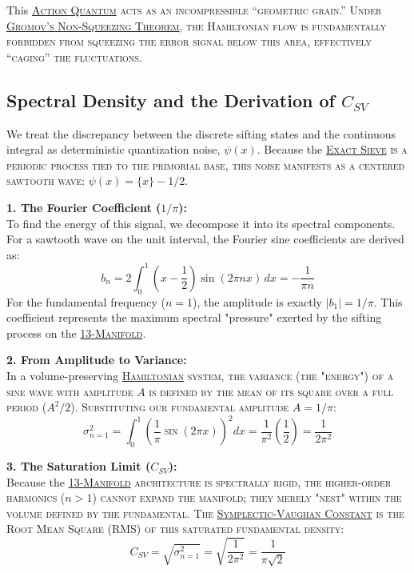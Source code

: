 \documentclass[sn-mathphys-num, pdflatex, referee]{sn-jnl}
\newcommand{\gterm}[2]{\begingroup\normalfont\scshape\hyperlink{#1}{#2}\endgroup}
\begin{document}
This \gterm{action_quantum}{Action Quantum} acts as an incompressible ``geometric grain.'' Under \gterm{gromov}{Gromov's Non-Squeezing Theorem}, the Hamiltonian flow is fundamentally forbidden from squeezing the error signal below this area, effectively ``caging'' the fluctuations.

\subsection{Spectral Density and the Derivation of \texorpdfstring{$C_{SV}$}{C\_SV}}
We treat the discrepancy between the discrete sifting states and the continuous integral as deterministic quantization noise, $\psi(x)$. Because the \gterm{exact_sieve}{Exact Sieve} is a periodic process tied to the primorial base, this noise manifests as a centered sawtooth wave: $\psi(x) = \{x\} - 1/2$.

\textbf{1. The Fourier Coefficient ($1/\pi$):}\\
To find the energy of this signal, we decompose it into its spectral components. For a sawtooth wave on the unit interval, the Fourier sine coefficients are derived as:
\begin{equation}
b_n = 2 \int_{0}^{1} \left( x - \frac{1}{2} \right) \sin(2\pi nx) \, dx = -\frac{1}{\pi n}
\end{equation}
For the fundamental frequency ($n=1$), the amplitude is exactly $|b_1| = 1/\pi$. This coefficient represents the maximum spectral "pressure" exerted by the sifting process on the \gterm{m13}{13-Manifold}.

\textbf{2. From Amplitude to Variance:}\\
In a volume-preserving \gterm{hamiltonian}{Hamiltonian} system, the variance (the "energy") of a sine wave with amplitude $A$ is defined by the mean of its square over a full period ($A^2/2$). Substituting our fundamental amplitude $A = 1/\pi$:
\begin{equation}
\sigma_{n=1}^2 = \int_{0}^{1} \left( \frac{1}{\pi} \sin(2\pi x) \right)^2 dx = \frac{1}{\pi^2} \left( \frac{1}{2} \right) = \frac{1}{2\pi^2}
\end{equation}

\textbf{3. The Saturation Limit ($C_{SV}$):}\\
Because the \gterm{m13}{13-Manifold} architecture is spectrally rigid, the higher-order harmonics ($n > 1$) cannot expand the manifold; they merely "nest" within the volume defined by the fundamental. The \gterm{csv}{Symplectic-Vaughan Constant} is the Root Mean Square (RMS) of this saturated fundamental density:
\begin{equation}
C_{SV} = \sqrt{\sigma_{n=1}^2} = \sqrt{\frac{1}{2\pi^2}} = \frac{1}{\pi\sqrt{2}}
\end{equation}
\end{document}
